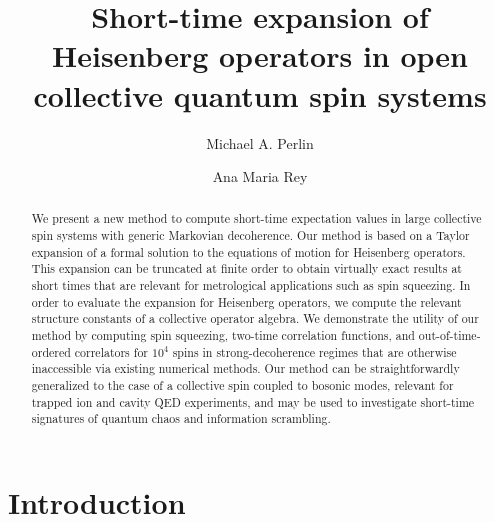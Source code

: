 \documentclass[pra,twocolumn,longbibliography]{revtex4-2}
\newcommand{\1}{\mathds{1}}
\begin{document}
\title{Short-time expansion of Heisenberg operators in open collective
  quantum spin systems}

\author{Michael A. Perlin}
\author{Ana Maria Rey}

\begin{abstract}
  We present a new method to compute short-time expectation values in
  large collective spin systems with generic Markovian decoherence.
  Our method is based on a Taylor expansion of a formal solution to
  the equations of motion for Heisenberg operators.  This expansion
  can be truncated at finite order to obtain virtually exact results
  at short times that are relevant for metrological applications such
  as spin squeezing.  In order to evaluate the expansion for
  Heisenberg operators, we compute the relevant structure constants of
  a collective operator algebra.  We demonstrate the utility of our
  method by computing spin squeezing, two-time correlation functions,
  and out-of-time-ordered correlators for $10^4$ spins in
  strong-decoherence regimes that are otherwise inaccessible via
  existing numerical methods.  Our method can be straightforwardly
  generalized to the case of a collective spin coupled to bosonic
  modes, relevant for trapped ion and cavity QED experiments, and may
  be used to investigate short-time signatures of quantum chaos and
  information scrambling.
\end{abstract}

\maketitle

\section{Introduction}
\end{document}

